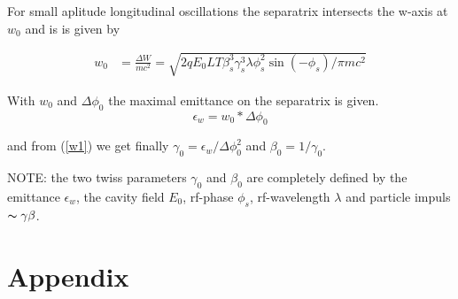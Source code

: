 \documentclass{article}
\begin{document}
For small aplitude longitudinal oscillations the separatrix intersects the w-axis at \(w_{0}\) and is is given by

\begin{align}
w_{0}&=\frac{\Delta W} {mc^{2}} = \sqrt{2qE_{0}LT\beta_{s}^{3}\gamma_{s}^{3}\lambda \phi_{s}^2 \sin(-\phi_{s})/\pi mc^{2}} \label{w0} 
\end{align}

With $w_{0}$ and $\Delta\phi_{0}$ the maximal emittance on the separatrix is given.
\begin{equation}
\epsilon_{w} = w_{0} * \Delta\phi_{0} \label{w1}
\end{equation}

and from (\ref{w1}) we get finally $\gamma_{0} = \epsilon_{w}/\Delta\phi_{0}^{2}$ and $\beta_{0} = 1/\gamma_{0}$.


NOTE: the two twiss parameters $\gamma_{0}$ and $\beta_{0}$ are completely defined by the emittance $\epsilon_{w}$, the cavity field $E_{0}$, rf-phase $\phi_{s}$, rf-wavelength $\lambda$ and particle impuls $\thicksim\gamma\beta$.

\section{Appendix}
\end{document}
